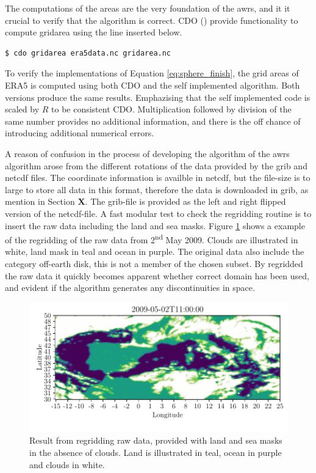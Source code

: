 The computations of the areas are the very foundation of the \acrshort{awrs}, and it it crucial to verify that the algorithm is correct. CDO (\cite{cdo}) provide functionality to compute gridarea using the line inserted below.
\begin{verbatim}
$ cdo gridarea era5data.nc gridarea.nc     
\end{verbatim}
To verify the implementations of Equation \eqref{eq:sphere_finish}, the grid areas of ERA5 is computed using both CDO and the self implemented algorithm. Both versions produce the same results.
Emphazising that the self implemented code is scaled by $R$ to be consistent CDO. Multiplication followed by division of the same number provides no additional information, and there is the off chance of introducing additional numerical errors. 

A reason of confusion in the process of developing the algorithm of the \acrshort{awrs} algorithm arose from the different rotations of the data provided by the \acrshort{grib} and \acrshort{netcdf} files. The coordinate information is availble in \acrshort{netcdf}, but the file-size is to large to store all data in this format, therefore the data is downloaded in \acrshort{grib}, as mention in Section \textbf{X}. The \acrshort{grib}-file is provided as the left and right flipped version of the  \acrshort{netcdf}-file. A fast modular test to check the regridding routine is to insert the raw data including the land and sea masks. Figure \ref{fig:visual_inspection_regridding} shows a example of the regridding of the raw data from 2\textsuperscript{nd} May 2009. Clouds are illustrated in white, land mask in teal and ocean in purple. The original data also include the category off-earth disk, this is not a member of the chosen subset. By regridded the raw data it quickly becomes apparent whether correct domain has been used, and evident if the algorithm generates any discontinuities in space. 
\begin{figure}
    \centering
    \includegraphics{python_figs/visual_regridding.pdf}
    \caption{Result from regridding raw data, provided with land and sea masks in the absence of clouds. Land is illustrated in teal, ocean in purple and clouds in white.}
    \label{fig:visual_inspection_regridding}
\end{figure}

